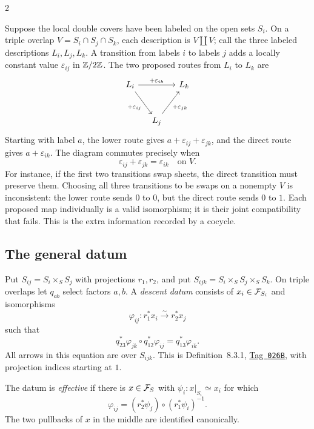 \documentclass[12pt]{memoir}
\newcommand{\BGtag}[1]{\href{https://stacks.math.columbia.edu/tag/#1}{Tag~\texttt{#1}}}
\begin{document}
\begin{multicols}{2}
\begin{Ex}
Suppose the local double covers have been labeled on the open sets
$S_i$. On a triple overlap $V=S_i\cap S_j\cap S_k$, each
description is $V\amalg V$; call the three labeled descriptions
$L_i,L_j,L_k$. A transition from labels $i$ to labels $j$ adds a
locally constant value $\varepsilon_{ij}$ in $\mathbb{Z}/2\mathbb{Z}$.
The two proposed routes from $L_i$ to $L_k$ are
\[
\begin{tikzcd}[column sep=small,row sep=large]
 L_i \arrow[rr,"+\varepsilon_{ik}"]
     \arrow[dr,"+\varepsilon_{ij}"']&&L_k\\
 &L_j \arrow[ur,"+\varepsilon_{jk}"']&
\end{tikzcd}
\]
Starting with label $a$, the lower route gives
$a+\varepsilon_{ij}+\varepsilon_{jk}$, and the direct route gives
$a+\varepsilon_{ik}$. The diagram commutes precisely when
\[
 \varepsilon_{ij}+\varepsilon_{jk}=\varepsilon_{ik}
 \quad\text{on }V.
\]
For instance, if the first two transitions swap sheets, the direct
transition must preserve them. Choosing all three transitions to be
swaps on a nonempty $V$ is inconsistent: the lower route sends $0$
to $0$, but the direct route sends $0$ to $1$. Each proposed map
individually is a valid isomorphism; it is their joint compatibility
that fails. This is the extra information recorded by a cocycle.
\end{Ex}

\subsection{The general datum}
Put $S_{ij}=S_i\times_S S_j$ with projections $r_1,r_2$, and put
$S_{ijk}=S_i\times_S S_j\times_S S_k$. On triple overlaps let $q_{ab}$
select factors $a,b$. A \emph{descent datum} consists of $x_i\in\mathcal{F}_{S_i}$
and isomorphisms
\[
 \varphi_{ij}:r_1^*x_i\xrightarrow{\sim}r_2^*x_j
\]
such that
\begin{equation}\label{eq:cocycle}
 q_{23}^*\varphi_{jk}\circ q_{12}^*\varphi_{ij}
 =q_{13}^*\varphi_{ik}.
\end{equation}
All arrows in this equation are over $S_{ijk}$. This is
Definition~8.3.1, \BGtag{026B}, with projection indices starting at $1$.

The datum is \emph{effective} if there is $x\in\mathcal{F}_S$ with
$\psi_i:x|_{S_i}\simeq x_i$ for which
\begin{equation}\label{eq:recovery}
 \varphi_{ij}=(r_2^*\psi_j)\circ(r_1^*\psi_i)^{-1}.
\end{equation}
The two pullbacks of $x$ in the middle are identified canonically.


\end{multicols}
\end{document}

